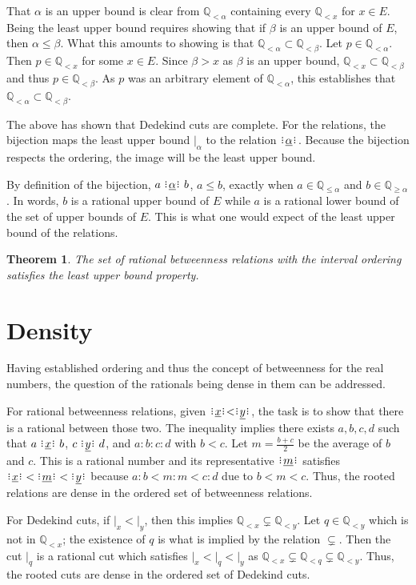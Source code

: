 \documentclass[12pt]{article}
\newtheorem{theorem}{Theorem}
\newcommand{\qcut}[2][x]{\ensuremath{\mathbb{Q}_{#2 #1}}}
\newcommand{\qlt}[1][x]{\qcut[#1]{<}}
\newcommand{\qgeq}[1][x]{\qcut[#1]{\geq}}
\newcommand{\qleq}[1][x]{\qcut[#1]{\leq}}
\newcommand{\cut}[1][x]{{\vert}_{#1} }
\newcommand{\yrel}{\xrel[y]}
\begin{document}
That $\alpha$ is an upper bound is clear from $\qlt[\alpha]$ containing every $\qlt$ for $x \in E$. Being the least upper bound requires showing that if $\beta$ is an upper bound of $E$, then $\alpha \leq \beta$. What this amounts to showing is that $\qlt[\alpha] \subset \qlt[\beta]$. Let $p \in \qlt[\alpha]$. Then $p \in \qlt$ for some $x \in E$. Since $\beta > x$ as $\beta$ is an upper bound, $\qlt \subset \qlt[\beta]$ and thus $p \in \qlt[\beta]$. As $p$ was an arbitrary element of $\qlt[\alpha]$, this  establishes that $\qlt[\alpha] \subset \qlt[\beta]$.

The above has shown that Dedekind cuts are complete. For the relations, the bijection  maps the least upper bound $\cut[\alpha]$ to the relation $\xrel[\alpha]$. Because the bijection respects the ordering, the image will be the least upper bound. 

By definition of the bijection, $a \xrel[\alpha] b$, $a \leq b$, exactly when $a \in \qleq [\alpha]$ and $b \in \qgeq[\alpha]$. In words, $b$ is a rational upper bound of $E$ while $a$ is a rational lower bound of the set of upper bounds of $E$. This is what one would expect of the least upper bound of the relations. 

\begin{theorem}
    The set of rational betweenness relations with the interval ordering satisfies the least upper bound property. 
\end{theorem}

\section{Density}

Having established ordering and thus the concept of betweenness for the real numbers, the question of the rationals being dense in them can be addressed.

For rational betweenness relations, given $\xrel < \yrel$, the task is to show that there is a rational between those two. The inequality implies there exists $a,b,c,d$ such that $a \xrel b$, $c \xrel[y] d$, and $a:b:c:d$ with $b < c$. Let $m = \frac{b+c}{2}$ be the average of $b$ and $c$. This is a rational number and its representative $\xrel[m]$ satisfies $\xrel  \:<\: \xrel[m]  \:<\: \xrel[y]$ because $a:b < m:m < c:d$ due to $b < m < c$. Thus, the rooted relations are dense in the ordered set of betweenness relations. 

For Dedekind cuts, if $\cut < \cut[y]$, then this implies $\qlt \subsetneq \qlt[y]$. Let $q \in \qlt[y]$ which is not in $\qlt$; the existence of $q$ is what is implied by the relation $\subsetneq$. Then the cut $\cut[q]$ is a rational cut which satisfies $\cut < \cut[q] < \cut[y]$ as $\qlt \subsetneq \qlt[q] \subsetneq \qlt[y]$.  Thus, the rooted cuts are dense in the ordered set of Dedekind cuts. 
\end{document}
